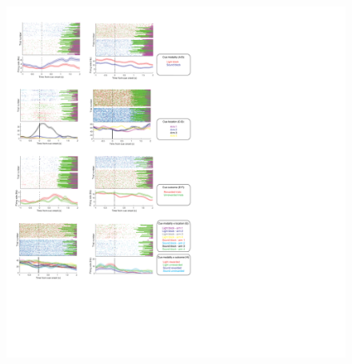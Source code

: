 \documentclass[11pt]{article}
\begin{document}
\begin{figure}[h]
\centering
\includegraphics[width=\textwidth]{Fig 5 - Neural examples.png}

\end{figure}
\end{document}
